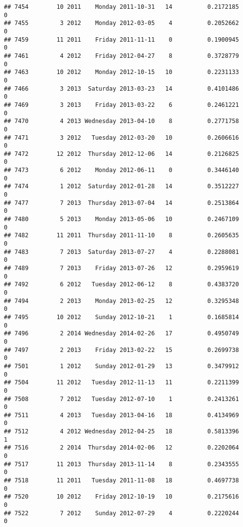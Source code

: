 \documentclass[
]{article}
\begin{document}
\begin{verbatim}
## 7454        10 2011    Monday 2011-10-31   14          0.2172185             0
## 7455         3 2012    Monday 2012-03-05    4          0.2052662             0
## 7459        11 2011    Friday 2011-11-11    0          0.1900945             0
## 7461         4 2012    Friday 2012-04-27    8          0.3728779             0
## 7463        10 2012    Monday 2012-10-15   10          0.2231133             0
## 7466         3 2013  Saturday 2013-03-23   14          0.4101486             0
## 7469         3 2013    Friday 2013-03-22    6          0.2461221             0
## 7470         4 2013 Wednesday 2013-04-10    8          0.2771758             0
## 7471         3 2012   Tuesday 2012-03-20   10          0.2606616             0
## 7472        12 2012  Thursday 2012-12-06   14          0.2126825             0
## 7473         6 2012    Monday 2012-06-11    0          0.3446140             0
## 7474         1 2012  Saturday 2012-01-28   14          0.3512227             0
## 7477         7 2013  Thursday 2013-07-04   14          0.2513864             0
## 7480         5 2013    Monday 2013-05-06   10          0.2467109             0
## 7482        11 2011  Thursday 2011-11-10    8          0.2605635             0
## 7483         7 2013  Saturday 2013-07-27    4          0.2288081             0
## 7489         7 2013    Friday 2013-07-26   12          0.2959619             0
## 7492         6 2012   Tuesday 2012-06-12    8          0.4383720             0
## 7494         2 2013    Monday 2013-02-25   12          0.3295348             0
## 7495        10 2012    Sunday 2012-10-21    1          0.1685814             0
## 7496         2 2014 Wednesday 2014-02-26   17          0.4950749             0
## 7497         2 2013    Friday 2013-02-22   15          0.2699738             0
## 7501         1 2012    Sunday 2012-01-29   13          0.3479912             0
## 7504        11 2012   Tuesday 2012-11-13   11          0.2211399             0
## 7508         7 2012   Tuesday 2012-07-10    1          0.2413261             0
## 7511         4 2013   Tuesday 2013-04-16   18          0.4134969             0
## 7512         4 2012 Wednesday 2012-04-25   18          0.5813396             1
## 7516         2 2014  Thursday 2014-02-06   12          0.2202064             0
## 7517        11 2013  Thursday 2013-11-14    8          0.2343555             0
## 7518        11 2011   Tuesday 2011-11-08   18          0.4697738             0
## 7520        10 2012    Friday 2012-10-19   10          0.2175616             0
## 7522         7 2012    Sunday 2012-07-29    4          0.2220244             0

\end{verbatim}
\end{document}
